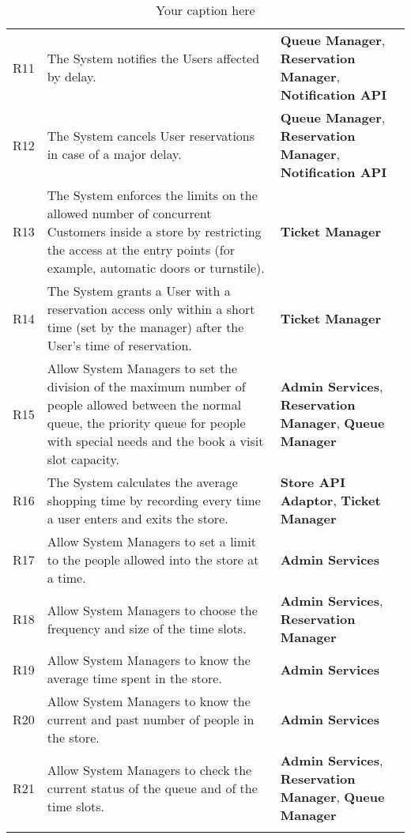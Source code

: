 \begin{longtable}{p{} p{} p{}}
    R11 & The System notifies the Users affected by delay. & \textbf{Queue Manager}, \textbf{Reservation Manager}, \textbf{Notification API}\\
    R12 & The System cancels User reservations in case of a major delay. & \textbf{Queue Manager}, \textbf{Reservation Manager}, \textbf{Notification API}\\
    R13 & The System enforces the limits on the allowed number of concurrent Customers inside a store by restricting the access at the entry points (for example, automatic doors or turnstile). & \textbf{Ticket Manager}\\
    R14 & The System grants a User with a reservation access only within a short time (set by the manager) after the User's time of reservation. & \textbf{Ticket Manager}\\
    R15 & Allow System Managers to set the division of the maximum number of people allowed between the normal queue, the priority queue for people with special needs and the book a visit slot capacity. & \textbf{Admin Services}, \textbf{Reservation Manager}, \textbf{Queue Manager}\\
    R16 & The System calculates the average shopping time by recording every time a user enters and exits the store. & \textbf{Store API Adaptor}, \textbf{Ticket Manager}\\
    
    R17 & Allow System Managers to set a limit to the people allowed into the store at a time. & \textbf{Admin Services}\\
    R18 & Allow System Managers to choose the frequency and size of the time slots. & \textbf{Admin Services}, \textbf{Reservation Manager}\\
    R19 & Allow System Managers to know the average time spent in the store. &  \textbf{Admin Services}\\
    R20 & Allow System Managers to know the current and past number of people in the store. & \textbf{Admin Services}\\
    R21 & Allow System Managers to check the current status of the queue and of the time slots. & \textbf{Admin Services}, \textbf{Reservation Manager}, \textbf{Queue Manager}\\

    \caption{Your caption here} %
    \label{tab:myfirstlongtable}
\end{longtable}
    